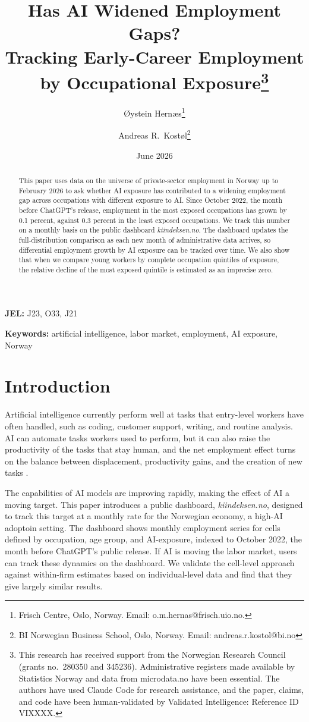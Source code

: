 \documentclass[12pt]{article}
\title{\textbf{Has AI Widened Employment Gaps?\\Tracking Early-Career Employment by Occupational Exposure}\thanks{This research has received support from the Norwegian Research Council (grants no.\ 280350 and 345236). Administrative registers made available by Statistics Norway and data from microdata.no have been essential. The authors have used Claude Code for research assistance, and the paper, claims, and code have been human-validated by Validated Intelligence: Reference ID VIXXXX. }}
\author{
  {\O}ystein Hern{\ae}s\thanks{Frisch Centre, Oslo, Norway. Email: o.m.hernas@frisch.uio.no.}
  \and
  Andreas R.\ Kost{\o}l\thanks{BI Norwegian Business School, Oslo, Norway. Email: andreas.r.kostol@bi.no}
}
\date{June 2026} %
\begin{document}
\maketitle

\begin{abstract}
\noindent
This paper uses data on the universe of private-sector employment in Norway up to February 2026 to ask whether AI exposure has contributed to a widening employment gap across occupations with different exposure to AI. Since October 2022, the month before ChatGPT's release, employment in the most exposed occupations has grown by 0.1 percent, against 0.3 percent in the least exposed occupations. We track this number on a monthly basis on the public dashboard \emph{kiindeksen.no}. The dashboard updates the full-distribution comparison as each new month of administrative data arrives, so differential employment growth by AI exposure can be tracked over time.
We also show that when we compare young workers by complete occupation quintiles of exposure, the relative decline of the most exposed quintile is estimated as an imprecise zero. 
\end{abstract}

\textbf{JEL:} J23, O33, J21

\textbf{Keywords:} artificial intelligence, labor market, employment, AI exposure, Norway

\clearpage
\setcounter{page}{1}


\section{Introduction}
\label{sec:introduction}

Artificial intelligence currently perform well at tasks that entry-level workers have often handled, such as coding, customer support, writing, and routine analysis. AI can automate tasks workers used to perform, but it can also raise the productivity of the tasks that stay human, and the net employment effect turns on the balance between displacement, productivity gains, and the creation of new tasks \citep{acemoglu2025}. 

The capabilities of AI models are improving rapidly, making the effect of AI a moving target. This paper introduces a public dashboard, \emph{kiindeksen.no}, designed to track this target at a monthly rate for the Norwegian economy, a high-AI adoptoin setting. The dashboard shows monthly employment series for cells defined by occupation, age group, and AI-exposure, indexed to October 2022, the month before ChatGPT's public release. If AI is moving the labor market, users can track these dynamics on the dashboard. We validate the cell-level approach against within-firm estimates based on individual-level data and find that they give largely similar results. 
\end{document}
